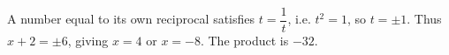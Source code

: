 A number equal to its own reciprocal satisfies $t=\dfrac1t$, i.e. $t^2=1$, so $t=\pm1$. Thus $x+2=\pm6$, giving $x=4$ or $x=-8$. The product is $\boxed{-32}$.
